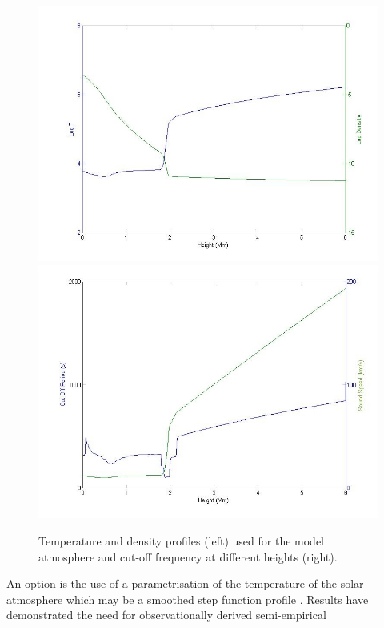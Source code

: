 \documentclass[preprint,authoryear,12pt]{elsarticle}
\begin{document}
\begin{figure}[h]
\begin{center}
\mbox{\includegraphics[scale=1]{imrescale/VAL3C_rho_temp_fig1L.jpg}}  
\mbox{\includegraphics[scale=1]{imrescale/soundspeedVAL3C_profile_fig1R.jpg}}
\par
\end{center}
\caption{Temperature and density profiles (left) used for the model atmosphere and cut-off frequency at different heights (right).}
\label{Fig1}
\end{figure}
An option is the use of a parametrisation of the temperature of the solar atmosphere which may be a smoothed step 
function profile  \citet{Murawski2010}. Results have demonstrated the need for observationally derived semi-empirical 
\end{document}
